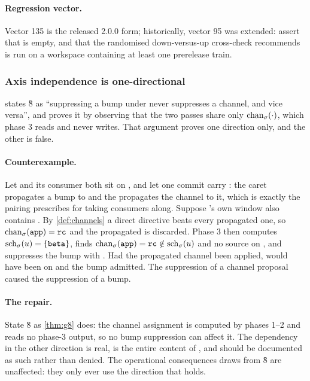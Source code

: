 \paragraph{Regression vector.} Vector 135 is the released 2.0.0 form; historically, vector 95 was extended: assert that
 is empty, and that the randomised
down-versus-up cross-check  recommends is run on a workspace
containing at least one prerelease train.

\subsubsection{Axis independence is one-directional}

\begin{obligation}
\label{ob:g8}
 states \G{8} as ``suppressing a bump under  never
suppresses a channel, and vice versa'', and proves it by observing that the two
passes share only $\mathrm{chan}_{\sigma}(\cdot)$, which phase 3 reads and never writes. That
argument proves one direction only, and the other is false.
\end{obligation}

\paragraph{Counterexample.} Let  and its consumer  both
sit on \stable, and let one commit carry : the
caret propagates a bump to  and the  propagates the
 channel to it, which is exactly the pairing  prescribes
for taking consumers along. Suppose 's own window also contains
. By \cref{def:channels} a direct directive beats every
propagated one, so $\mathrm{chan}_{\sigma}(\texttt{app}) = \texttt{rc}$ and the propagated
 is discarded. Phase 3 then computes
$\mathrm{sch}_{\sigma}(u) = \{\texttt{beta}\}$, finds
$\mathrm{chan}_{\sigma}(\texttt{app}) = \texttt{rc} \notin \mathrm{sch}_{\sigma}(u)$ and no source on
\stable, and suppresses the bump with . Had the propagated channel
been applied,  would have been on  and the bump admitted.
The suppression of a channel proposal caused the suppression of a bump.

\paragraph{The repair.} State \G{8} as \cref{thm:g8} does: the channel
assignment is computed by phases 1--2 and reads no phase-3 output, so no bump
suppression can affect it. The dependency in the other direction is real, is
the entire content of , and should be documented as such rather than
denied. The operational consequences  draws from \G{8} are
unaffected: they only ever use the direction that holds.

